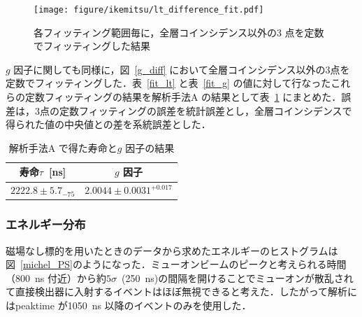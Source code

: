 \begin{figure}[H]
\centering
\texttt{[image: figure/ikemitsu/lt\_difference\_fit.pdf]}
\caption{各フィッティング範囲毎に，全層コインシデンス以外の3 点を定数でフィッティングした結果}
\label{lt_diff_fit}
\end{figure}

$g$ 因子に関しても同様に，図~\ref{g_diff} において全層コインシデンス以外の3点を定数でフィッティングした．表~\ref{fit_lt} と表~\ref{fit_g} の値に対して行なったこれらの定数フィッティングの結果を解析手法A の結果として表~\ref{kaisekiA_matome} にまとめた．誤差は，3点の定数フィッティングの誤差を統計誤差とし，全層コインシデンスで得られた値の中央値との差を系統誤差とした．

\begin{table}[H]
\caption{解析手法A で得た寿命と$g$ 因子の結果}
\label{kaisekiA_matome}
\centering
\begin{tabular}{cc}\toprule
寿命$\tau$~[ns] & $g$ 因子 \\ \midrule
$2222.8\pm5.7 _{-75}$ & $2.0044\pm 0.0031^{+0.017}$ \\ \bottomrule
\end{tabular}
\end{table}
  
\subsubsection{エネルギー分布}
磁場なし標的を用いたときのデータから求めたエネルギーのヒストグラムは図~\ref{michel_PS}のようになった．ミューオンビームのピークと考えられる時間（800~ns 付近）から約$5\sigma$~(250~ns)の間隔を開けることでミューオンが散乱されて直接検出器に入射するイベントはほぼ無視できると考えた．したがって解析にはpeaktime が1050~ns 以降のイベントのみを使用した．
  
